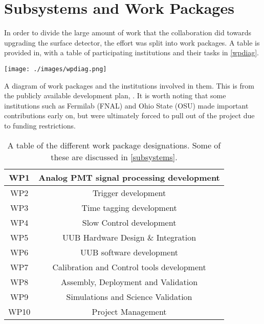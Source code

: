 \chapter{Subsystems and Work Packages}
In order to divide the large amount of work that the collaboration did towards upgrading the surface detector, the effort was split into work packages. A table is provided in, with a table of participating institutions and their tasks in \autoref{wpdiag}. %
\begin{table}[h!]
\centering
\texttt{[image: ./images/wpdiag.png]}
\caption[Auger Prime Institutions]{A diagram of work packages and the institutions involved in them. This is from the publicly available development plan, . It is worth noting that some institutions such as Fermilab (FNAL) and Ohio State (OSU) made important contributions early on, but were ultimately forced to pull out of the project due to funding restrictions. }
\label{wpdiag}

\end{table}
\begin{table}[h!]
\centering
\begin{tabular}{|c|c|} \hline
WP1 & Analog PMT signal processing development \\ \hline
WP2 & Trigger development \\ \hline
WP3 & Time tagging development \\ \hline
WP4 & Slow Control development \\ \hline
WP5 & UUB Hardware Design \& Integration \\ \hline
WP6 & UUB software development \\ \hline
WP7 & Calibration and Control tools development \\ \hline
WP8 & Assembly, Deployment and Validation \\ \hline
WP9 & Simulations and Science Validation \\ \hline
WP10 & Project Management \\ \hline
\end{tabular}
\caption[Auger Work Packages]{A table of the different work package designations. Some of these are discussed in \autoref{subsystems}.}
\label{wptab}
\end{table}
